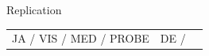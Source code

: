 \documentclass[final]{beamer}
\begin{document}
\begin{frame}{}
\begin{textblock}{67}
\begin{block}{Replication}
\begin{tabular}{c c c}
JA / VIS / MED / PROBE & DE /
\end{tabular}
\end{block}
\end{textblock}
\end{frame}
\end{document}

